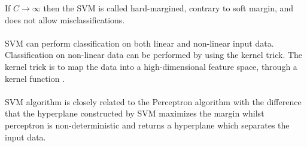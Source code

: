 If $C \rightarrow \infty$ then the SVM is called hard-margined, contrary to soft margin, and does not allow misclassifications.
\\\\
SVM can perform classification on both linear and non-linear input data. Classification on non-linear data can be performed by using the kernel trick. The kernel trick is to map the data into a high-dimensional feature space, through a kernel function \citep{svm_ai}.
\\\\
SVM algorithm is closely related to the Perceptron algorithm with the difference that the hyperplane constructed by SVM maximizes the margin whilst perceptron is non-deterministic and returns a hyperplane which separates the input data.
